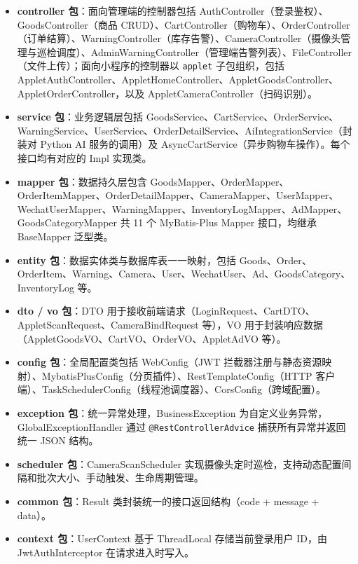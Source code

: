 \begin{itemize}[leftmargin=2em]
  \item \textbf{controller 包}：面向管理端的控制器包括 AuthController（登录鉴权）、GoodsController（商品 CRUD）、CartController（购物车）、OrderController（订单结算）、WarningController（库存告警）、CameraController（摄像头管理与巡检调度）、AdminWarningController（管理端告警列表）、FileController（文件上传）；面向小程序的控制器以 \texttt{applet} 子包组织，包括 AppletAuthController、AppletHomeController、AppletGoodsController、AppletOrderController，以及 AppletCameraController（扫码识别）。
  \item \textbf{service 包}：业务逻辑层包括 GoodsService、CartService、OrderService、WarningService、UserService、OrderDetailService、AiIntegrationService（封装对 Python AI 服务的调用）及 AsyncCartService（异步购物车操作）。每个接口均有对应的 Impl 实现类。
  \item \textbf{mapper 包}：数据持久层包含 GoodsMapper、OrderMapper、OrderItemMapper、OrderDetailMapper、CameraMapper、UserMapper、WechatUserMapper、WarningMapper、InventoryLogMapper、AdMapper、GoodsCategoryMapper 共 11 个 MyBatis-Plus Mapper 接口，均继承 BaseMapper 泛型类。
  \item \textbf{entity 包}：数据实体类与数据库表一一映射，包括 Goods、Order、OrderItem、Warning、Camera、User、WechatUser、Ad、GoodsCategory、InventoryLog 等。
  \item \textbf{dto / vo 包}：DTO 用于接收前端请求（LoginRequest、CartDTO、AppletScanRequest、CameraBindRequest 等），VO 用于封装响应数据（AppletGoodsVO、CartVO、OrderVO、AppletAdVO 等）。
  \item \textbf{config 包}：全局配置类包括 WebConfig（JWT 拦截器注册与静态资源映射）、MybatisPlusConfig（分页插件）、RestTemplateConfig（HTTP 客户端）、TaskSchedulerConfig（线程池调度器）、CorsConfig（跨域配置）。
  \item \textbf{exception 包}：统一异常处理，BusinessException 为自定义业务异常，GlobalExceptionHandler 通过 \texttt{@RestControllerAdvice} 捕获所有异常并返回统一 JSON 结构。
  \item \textbf{scheduler 包}：CameraScanScheduler 实现摄像头定时巡检，支持动态配置间隔和批次大小、手动触发、生命周期管理。
  \item \textbf{common 包}：Result 类封装统一的接口返回结构（code + message + data）。
  \item \textbf{context 包}：UserContext 基于 ThreadLocal 存储当前登录用户 ID，由 JwtAuthInterceptor 在请求进入时写入。
\end{itemize}

